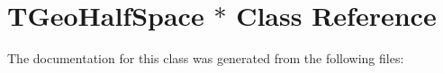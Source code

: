 \hypertarget{class_t_geo_half_space_01_5}{}\section{T\+Geo\+Half\+Space $\ast$ Class Reference}
\label{class_t_geo_half_space_01_5}


The documentation for this class was generated from the following files\+: